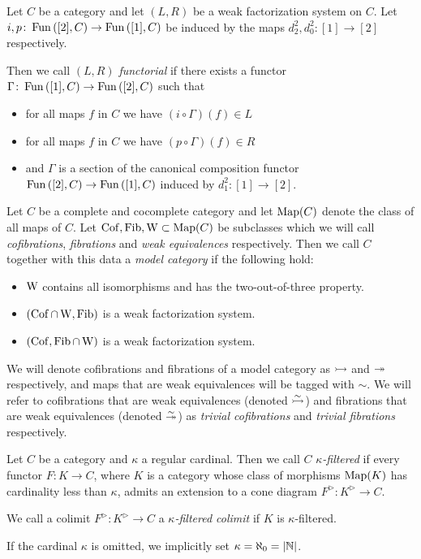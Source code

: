 \begin{definition}
    Let $C$ be a category and let $(L,R)$ be a weak factorization system on $C$.
    Let $i,p\colon\operatorname{Fun}\left([2],C\right)\to\operatorname{Fun}\left([1],C\right)$ be induced by the maps $d_2^2,d_0^2\colon [1]\to[2]$ respectively.

    Then we call $(L,R)$ \emph{functorial} if there exists a functor $\Gamma\colon\operatorname{Fun}\left([1],C\right)\to\operatorname{Fun}\left([2],C\right)$ such that
    \begin{itemize}
        \item for all maps $f$ in $C$ we have $(i\circ\Gamma)(f)\in L$
        \item for all maps $f$ in $C$ we have $(p\circ\Gamma)(f)\in R$
        \item and $\Gamma$ is a section of the canonical composition functor $\operatorname{Fun}\left([2],C\right)\to\operatorname{Fun}\left([1],C\right)$ induced by $d_1^2\colon [1]\to[2]$. 
    \end{itemize}
\end{definition}
\begin{definition}
    Let $C$ be a complete and cocomplete category and let $\operatorname{Map}(C)$ denote the class of all maps of $C$.
    Let $\operatorname{Cof},\operatorname{Fib},\operatorname{W}\subset\operatorname{Map}(C)$ be subclasses which we will call \emph{cofibrations}, \emph{fibrations} and \emph{weak equivalences} respectively.
    Then we call $C$ together with this data a \emph{model category} if the following hold:
    \begin{itemize}
        \item $\operatorname{W}$ contains all isomorphisms and has the two-out-of-three property.
        \item $(\operatorname{Cof}\cap\operatorname{W},\operatorname{Fib})$ is a weak factorization system.
        \item $(\operatorname{Cof},\operatorname{Fib}\cap\operatorname{W})$ is a weak factorization system.
    \end{itemize}
    We will denote cofibrations and fibrations of a model category as $\xtailrightarrow{}$ and $\xtwoheadrightarrow{}$ respectively, and maps that are weak equivalences will be tagged with $\sim$.
    We will refer to cofibrations that are weak equivalences (denoted $\xtailrightarrow{\sim}$) and fibrations that are weak equivalences (denoted $\xtwoheadrightarrow{\sim}$) as \emph{trivial cofibrations} and \emph{trivial fibrations} respectively.
\end{definition}
\begin{definition}
    Let $C$ be a category and $\kappa$ a regular cardinal.
    Then we call $C$ \emph{$\kappa$-filtered} if every functor $F\colon K\to C$, where $K$ is a category whose class of morphisms $\operatorname{Map}(K)$ has cardinality less than $\kappa$, admits an extension to a cone diagram $F^{\rhd}\colon K^{\rhd}\to C$.

    We call a colimit $F^{\rhd}\colon K^{\rhd}\to C$ a \emph{$\kappa$-filtered colimit} if $K$ is $\kappa$-filtered.
    
    If the cardinal $\kappa$ is omitted, we implicitly set $\kappa=\aleph_0=|\mathbb{N}|$.
\end{definition}
